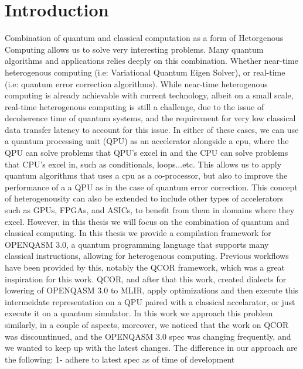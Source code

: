 \chapter{Introduction}
\label{chapter:Introduction}
Combination of quantum and classical computation as a form of Hetorgenous Computing allows us
to solve very interesting problems. Many quantum algorithms and applications relies
deeply on this combination. Whether near-time heterogenous computing (i.e: Variational Quantum Eigen Solver),
or real-time (i.e: quantum error correction algorithms). While near-time heterogenous computing
is already achievable with current technology, albeit on a small scale, 
real-time heterogenous computing is still a
challenge,
due to the issue of decoherence time of quantum systems, and the requirement for
very low classical data transfer latency to account for this issue. In either
of these cases, we can use a quantum processing unit (QPU) as an accelerator
alongside a cpu, where the QPU can solve problems that QPU's excel in and the
CPU can solve problems that CPU's excel in, such as conditionals, loops...etc.
This allows us to apply quantum algorithms that uses a cpu as a co-processor,
but also to improve the performance of a a QPU as in the case of quantum error
correction.  This concept of heterogenousity can also be extended to include
other types of accelerators such as GPUs, FPGAs, and ASICs, to benefit from them
in domains where they excel. However, in this thesis we will focus on the
combination of quantum and classical computing. In this thesis we provide a compilation 
framework for OPENQASM 3.0, a quantum programming language that supports many classical instructions,
allowing for heterogenous computing. Previous workflows have been provided by this,
notably the QCOR framework, which was a great inspiration for this work. QCOR, and after that this work,
created dialects for lowering of OPENQASM 3.0 to MLIR, apply optimizations and then
execute this intermeidate representation on a QPU paired with a classical accelarator, or just execute it 
on a quantum simulator.
In this work we approach this problem similarly, in a couple of aspects, moreover,
we noticed that the work on QCOR was discountinued, and the OPENQASM 3.0 spec was changing
frequently, and we wanted to keep up with the latest changes. 
The difference in our approach are the following:
1- adhere to latest spec as of time of development
